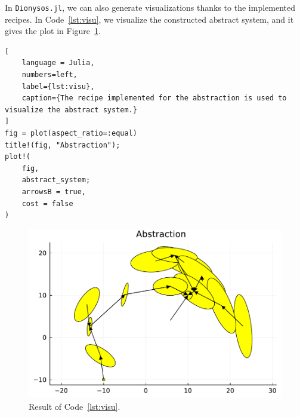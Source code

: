 \documentclass{juliacon}
\begin{document}
In \texttt{Dionysos.jl}, we can also generate visualizations thanks to the implemented recipes. In Code~\ref{lst:visu}, we visualize the constructed abstract system, and it gives the plot in Figure~\ref{fig:ex_plot}.
\begin{lstlisting}[
    language = Julia, 
    numbers=left, 
    label={lst:visu}, 
    caption={The recipe implemented for the abstraction is used to visualize the abstract system.}
]
fig = plot(aspect_ratio=:equal)
title!(fig, "Abstraction");
plot!(
    fig, 
    abstract_system; 
    arrowsB = true, 
    cost = false
)
\end{lstlisting}
\begin{figure}[ht!]
    \centerline{\includegraphics[width=\linewidth]{Figures/Example/abs.pdf}}
    \caption{Result of Code~\ref{lst:visu}.}
    \label{fig:ex_plot}
\end{figure}
\end{document}
